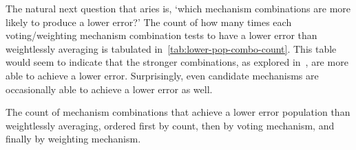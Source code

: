 The natural next question that aries is, `which mechanism combinations are more likely
to produce a lower error?'
The count of how many times each voting/weighting mechanism combination
tests to have a lower error than weightlessly averaging is tabulated
in~\autoref{tab:lower-pop-combo-count}.
This table would seem to indicate that the stronger combinations, as explored
in~, are more able to achieve a lower
error.
Surprisingly, even candidate mechanisms are occasionally able to achieve a lower error
as well.

\begin{table}[htbp]
    \renewcommand{\arraystretch}{1.0}

    \caption{The count of mechanism combinations that achieve a lower error
    population than weightlessly averaging, ordered first by count, then by voting
    mechanism, and finally by weighting mechanism.}
    \label{tab:lower-pop-combo-count}


\end{table}
